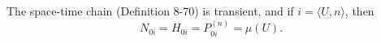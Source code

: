 The space-time chain (Definition 8-70) is transient, and if $i = \langle U, n \rangle$, then
$$N_{0i} = H_{0i} = P_{0i}^{(n)} = \mu(U).$$
